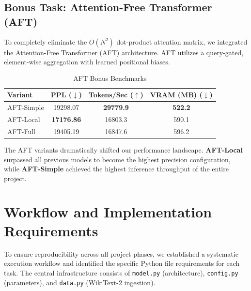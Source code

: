\documentclass[11pt,a4paper]{article}
\begin{document}
\subsection{Bonus Task: Attention-Free Transformer (AFT)}
To completely eliminate the $O(N^2)$ dot-product attention matrix, we integrated the Attention-Free Transformer (AFT) architecture. AFT utilizes a query-gated, element-wise aggregation with learned positional biases.

\begin{table}[h]
    \centering
    \caption{AFT Bonus Benchmarks}
    \begin{tabular}{lccc}
        \toprule
        \textbf{Variant} & \textbf{PPL} ($\downarrow$) & \textbf{Tokens/Sec} ($\uparrow$) & \textbf{VRAM (MB)} ($\downarrow$) \\
        \midrule
        AFT-Simple & 19298.07 & \textbf{29779.9} & \textbf{522.2} \\
        AFT-Local  & \textbf{17176.86} & 16803.3 & 590.1 \\
        AFT-Full   & 19405.19 & 16847.6 & 596.2 \\
        \bottomrule
    \end{tabular}
    \label{tab:aft_benchmarks}
\end{table}

The AFT variants dramatically shifted our performance landscape. \textbf{AFT-Local} surpassed all previous models to become the highest precision configuration, while \textbf{AFT-Simple} achieved the highest inference throughput of the entire project.

\section{Workflow and Implementation Requirements}

To ensure reproducibility across all project phases, we established a systematic execution workflow and identified the specific Python file requirements for each task. The central infrastructure consists of \texttt{model.py} (architecture), \texttt{config.py} (parameters), and \texttt{data.py} (WikiText-2 ingestion).
\end{document}
